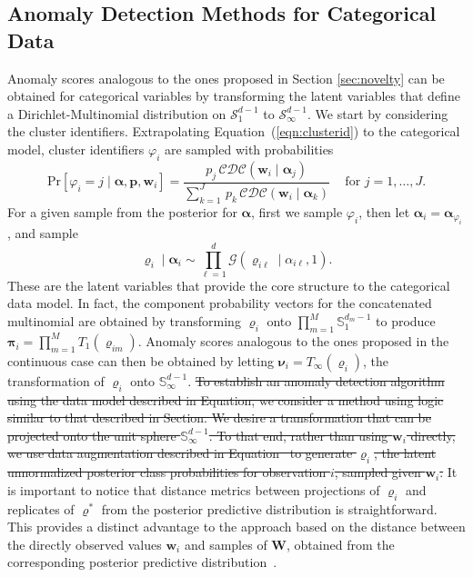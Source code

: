 \subsection{Anomaly Detection Methods for Categorical Data\label{subsec:catscores}}
Anomaly scores analogous to the ones proposed in Section \ref{sec:novelty} can be 
obtained for categorical variables by transforming the latent variables that define
a Dirichlet-Multinomial distribution on $\mathcal{S}_1^{d-1}$ to $\mathcal{S}_\infty^{d-1}$. 
We start by considering the cluster identifiers. Extrapolating Equation~(\ref{eqn:clusterid})
    to the categorical model, cluster identifiers $\varphi_i$ are sampled with probabilities
    \begin{equation}
        \label{eqn:latentposterior}
        \text{Pr}[\varphi_i = j\mid \bm{\alpha}, \bm{p}, \bm{w}_i] = \frac{p_j\,\mathcal{CDC}\left(\bm{w}_i\mid\bm{\alpha}_j\right)}{\sum_{k = 1}^J\,p_k\,\mathcal{CDC}\left(\bm{w}_i\mid\bm{\alpha}_k\right)}
            \;\;\;\text{ for }j = 1, \ldots, J.
    \end{equation}
    For a given sample from the posterior for $\bm{\alpha}$,
    first we sample $\varphi_i$, then let $\bm{\alpha}_i = \bm{\alpha}_{\varphi_i}$, and
    sample
    \begin{equation}
        \label{eqn:postpredrho}
        \bm{\varrho}_i\mid\bm{\alpha}_i \sim 
        \prod_{\ell = 1}^d\mathcal{G}\left(\varrho_{i\ell}\mid\alpha_{i\ell}, 1\right).
    \end{equation}
    These are the latent variables that provide the core structure to the categorical
    data model. In fact, the component probability vectors for the concatenated multinomial
    are obtained by transforming $\bm{\varrho}_i$ onto $\prod_{m = 1}^M\mathbb{S}_1^{{d_m}-1}$
    to produce $\bm{\pi}_i = \prod_{m=1}^{M}T_1(\bm{\varrho}_{im})$. Anomaly scores
    analogous to the ones proposed in the continuous case can then be obtained by
    letting $\bm{\nu}_i = T_{\infty}(\bm{\varrho}_i)$, the transformation of $\bm{\varrho}_i$ 
    onto $\mathbb{S}_{\infty}^{d-1}$.
\st{To establish an anomaly detection algorithm using the data model described in 
    Equation, we consider a method using logic similar to 
    that described in Section.  We desire a transformation that 
    can be projected onto the unit sphere $\mathbb{S}_{\infty}^{d-1}$.  To that 
    end, rather than using $\bm{w}_i$ directly, we use data augmentation
    described in Equation~ to generate $\bm{\varrho}_i$, 
    the latent unnormalized posterior class probabilities for observation $i$, 
    sampled given $\bm{w}_i$.}  It is important to notice that distance metrics 
    between projections of $\bm{\varrho}_i$ and  replicates of $\bm{\varrho}^*$ 
    from the posterior predictive distribution is straightforward. This provides
    a distinct advantage to the approach based on the distance between the 
    directly observed values $\bm{w}_i$ and samples of $\bm{W}$, obtained 
    from the corresponding posterior predictive distribution~\citep{Alamuri2014}. 
    
